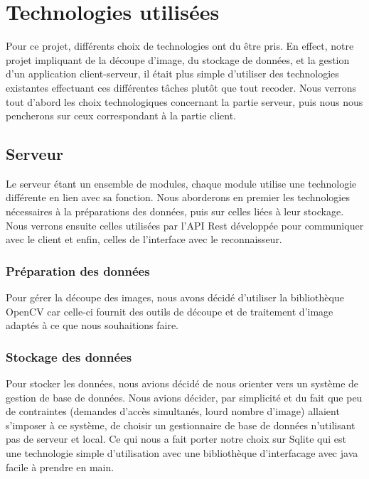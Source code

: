 \chapter{Technologies utilisées}

Pour ce projet, différents choix de technologies ont du être pris. En effect, notre projet impliquant de la découpe d'image, du stockage de données, et la gestion d'un application client-serveur, il était plus simple d'utiliser des technologies existantes effectuant ces différentes tâches plutôt que tout recoder.
Nous verrons tout d'abord les choix technologiques concernant la partie serveur, puis nous nous pencherons sur ceux correspondant à la partie client.

\section{Serveur}

Le serveur étant un ensemble de modules, chaque module utilise une technologie différente en lien avec sa fonction. Nous aborderons en premier les technologies nécessaires à la préparations des données, puis sur celles liées à leur stockage. Nous verrons ensuite celles utilisées par l'API Rest développée pour communiquer avec le client et enfin, celles de l'interface avec le reconnaisseur.

\subsection{Préparation des données}

Pour gérer la découpe des images, nous avons décidé d'utiliser la bibliothèque OpenCV car celle-ci fournit des outils de découpe et de traitement d'image adaptés à ce que nous souhaitions faire.

\subsection{Stockage des données}

Pour stocker les données, nous avions décidé de nous orienter vers un système de gestion de base de données. Nous avions décider, par simplicité et du fait que peu de contraintes (demandes d'accès simultanés, lourd nombre d'image) allaient s'imposer à ce système, de choisir un gestionnaire de base de données n'utilisant pas de serveur et local. Ce qui nous a fait porter notre choix sur Sqlite qui est une technologie simple d'utilisation avec une bibliothèque d'interfacage avec java facile à prendre en main.

